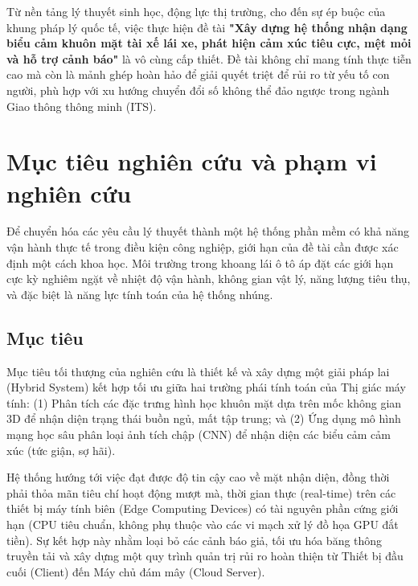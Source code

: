 \documentclass[../DoAn.tex]{subfiles}
\begin{document}
Từ nền tảng lý thuyết sinh học, động lực thị trường, cho đến sự ép buộc của khung pháp lý quốc tế, việc thực hiện đề tài \textbf{"Xây dựng hệ thống nhận dạng biểu cảm khuôn mặt tài xế lái xe, phát hiện cảm xúc tiêu cực, mệt mỏi và hỗ trợ cảnh báo"} là vô cùng cấp thiết. Đề tài không chỉ mang tính thực tiễn cao mà còn là mảnh ghép hoàn hảo để giải quyết triệt để rủi ro từ yếu tố con người, phù hợp với xu hướng chuyển đổi số không thể đảo ngược trong ngành Giao thông thông minh (ITS).

\section{Mục tiêu nghiên cứu và phạm vi nghiên cứu}
\label{section:1.2}
Để chuyển hóa các yêu cầu lý thuyết thành một hệ thống phần mềm có khả năng vận hành thực tế trong điều kiện công nghiệp, giới hạn của đề tài cần được xác định một cách khoa học. Môi trường trong khoang lái ô tô áp đặt các giới hạn cực kỳ nghiêm ngặt về nhiệt độ vận hành, không gian vật lý, năng lượng tiêu thụ, và đặc biệt là năng lực tính toán của hệ thống nhúng.

\subsection{Mục tiêu}
Mục tiêu tối thượng của nghiên cứu là thiết kế và xây dựng một giải pháp lai (Hybrid System) kết hợp tối ưu giữa hai trường phái tính toán của Thị giác máy tính: (1) Phân tích các đặc trưng hình học khuôn mặt dựa trên mốc không gian 3D để nhận diện trạng thái buồn ngủ, mất tập trung; và (2) Ứng dụng mô hình mạng học sâu phân loại ảnh tích chập (CNN) để nhận diện các biểu cảm cảm xúc (tức giận, sợ hãi).

Hệ thống hướng tới việc đạt được độ tin cậy cao về mặt nhận diện, đồng thời phải thỏa mãn tiêu chí hoạt động mượt mà, thời gian thực (real-time) trên các thiết bị máy tính biên (Edge Computing Devices) có tài nguyên phần cứng giới hạn (CPU tiêu chuẩn, không phụ thuộc vào các vi mạch xử lý đồ họa GPU đắt tiền). Sự kết hợp này nhằm loại bỏ các cảnh báo giả, tối ưu hóa băng thông truyền tải và xây dựng một quy trình quản trị rủi ro hoàn thiện từ Thiết bị đầu cuối (Client) đến Máy chủ đám mây (Cloud Server).
\end{document}
